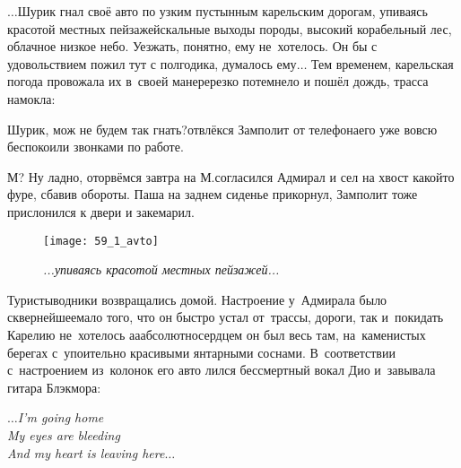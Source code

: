 
$\ldots$Шурик гнал своё авто по узким пустынным карельским дорогам, упиваясь красотой местных пейзажей\mdash скальные выходы породы, высокий корабельный лес, облачное низкое небо. Уезжать, понятно, ему не~хотелось. Он бы с удовольствием пожил тут с полгодика, думалось ему$\ldots$ Тем временем, карельская погода провожала их в~своей манере\mdash резко потемнело и пошёл дождь, трасса намокла:

{
\diagdash Шурик, мож не будем так гнать?\mdash отвлёкся Замполит от телефона\mdash его уже вовсю беспокоили звонками по работе.

\diagdash М? Ну ладно, оторвёмся завтра на М.\mdash согласился Адмирал и сел на хвост какой\sdash то фуре, сбавив обороты. Паша на заднем сиденье прикорнул, Замполит тоже прислонился к двери и закемарил.
}

\newpage

\begin{figure}[h]
	\centering
	\texttt{[image: 59\_1\_avto]}
	\caption{\small\textit{...упиваясь красотой местных пейзажей...}}
\end{figure}
Туристы\sdash водники возвращались домой. Настроение у~Адмирала было сквернейшее\mdash мало того, что он быстро устал от~трассы, дороги, так и~покидать Карелию не~хотелось а\sdash а\sdash абсолютно\mdash сердцем он был весь там, на~каменистых берегах с~упоительно красивыми янтарными соснами. В~соответствии с~настроением из~колонок его авто лился бессмертный вокал Дио и~завывала гитара Блэкмора:

\vspace{1.0cm}
\noindent\textit{%
	\hspace*{3.4cm}$\ldots$I'm going home\\
	\hspace*{3.4cm}My eyes are bleeding\\
	\hspace*{3.4cm}And my heart is leaving here$\ldots$%
}

